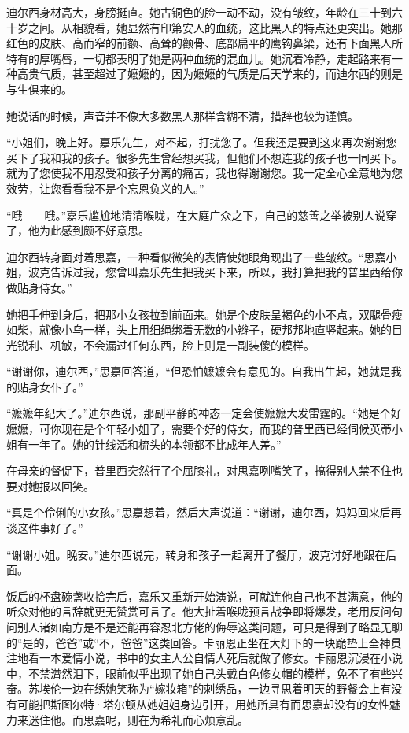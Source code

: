 \par 迪尔西身材高大，身膀挺直。她古铜色的脸一动不动，没有皱纹，年龄在三十到六十岁之间。从相貌看，她显然有印第安人的血统，这比黑人的特点还更突出。她那红色的皮肤、高而窄的前额、高耸的颧骨、底部扁平的鹰钩鼻梁，还有下面黑人所特有的厚嘴唇，一切都表明了她是两种血统的混血儿。她沉着冷静，走起路来有一种高贵气质，甚至超过了嬷嬷的，因为嬷嬷的气质是后天学来的，而迪尔西的则是与生俱来的。
\par 她说话的时候，声音并不像大多数黑人那样含糊不清，措辞也较为谨慎。
\par “小姐们，晚上好。嘉乐先生，对不起，打扰您了。但我还是要到这来再次谢谢您买下了我和我的孩子。很多先生曾经想买我，但他们不想连我的孩子也一同买下。就为了您使我不用忍受和孩子分离的痛苦，我也得谢谢您。我一定全心全意地为您效劳，让您看看我不是个忘恩负义的人。”
\par “哦——哦。”嘉乐尴尬地清清喉咙，在大庭广众之下，自己的慈善之举被别人说穿了，他为此感到颇不好意思。
\par 迪尔西转身面对着思嘉，一种看似微笑的表情使她眼角现出了一些皱纹。“思嘉小姐，波克告诉过我，您曾叫嘉乐先生把我买下来，所以，我打算把我的普里西给你做贴身侍女。”
\par 她把手伸到身后，把那小女孩拉到前面来。她是个皮肤呈褐色的小不点，双腿骨瘦如柴，就像小鸟一样，头上用细绳绑着无数的小辫子，硬邦邦地直竖起来。她的目光锐利、机敏，不会漏过任何东西，脸上则是一副装傻的模样。
\par “谢谢你，迪尔西，”思嘉回答道，“但恐怕嬷嬷会有意见的。自我出生起，她就是我的贴身女仆了。”
\par “嬷嬷年纪大了。”迪尔西说，那副平静的神态一定会使嬷嬷大发雷霆的。“她是个好嬷嬷，可你现在是个年轻小姐了，需要个好的侍女，而我的普里西已经伺候英蒂小姐有一年了。她的针线活和梳头的本领都不比成年人差。”
\par 在母亲的督促下，普里西突然行了个屈膝礼，对思嘉咧嘴笑了，搞得别人禁不住也要对她报以回笑。
\par “真是个伶俐的小女孩。”思嘉想着，然后大声说道：“谢谢，迪尔西，妈妈回来后再谈这件事好了。”
\par “谢谢小姐。晚安。”迪尔西说完，转身和孩子一起离开了餐厅，波克讨好地跟在后面。
\par 饭后的杯盘碗盏收拾完后，嘉乐又重新开始演说，可就连他自己也不甚满意，他的听众对他的言辞就更无赞赏可言了。他大扯着喉咙预言战争即将爆发，老用反问句问别人诸如南方是不是还能再容忍北方佬的侮辱这类问题，可只是得到了略显无聊的“是的，爸爸”或“不，爸爸”这类回答。卡丽恩正坐在大灯下的一块跪垫上全神贯注地看一本爱情小说，书中的女主人公自情人死后就做了修女。卡丽恩沉浸在小说中，不禁潸然泪下，眼前似乎出现了她自己头戴白色修女帽的模样，免不了有些兴奋。苏埃伦一边在绣她笑称为“嫁妆箱”的刺绣品，一边寻思着明天的野餐会上有没有可能把斯图尔特·塔尔顿从她姐姐身边引开，用她所具有而思嘉却没有的女性魅力来迷住他。而思嘉呢，则在为希礼而心烦意乱。
